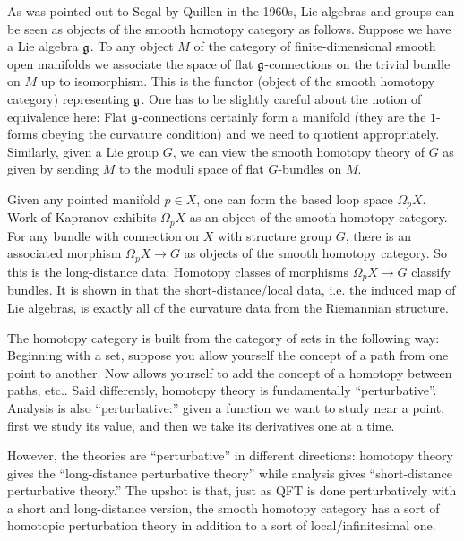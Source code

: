 As was pointed out to Segal by Quillen in the 1960s, 
Lie algebras and groups can be seen as objects of the smooth homotopy category as follows.
Suppose we have a Lie algebra $\mathfrak{g}$. To any object $M$ of the category of 
finite-dimensional smooth open manifolds 
we associate the space of flat $\mathfrak{g}$-connections on the trivial bundle on $M$ up to
isomorphism.
This is the functor (object of the smooth homotopy category) representing $\mathfrak{g}$. 
One has to be slightly careful about the notion of equivalence here:
Flat $\mathfrak{g}$-connections certainly form a manifold
(they are the $1$-forms obeying the curvature condition)
and we need to quotient appropriately. 
Similarly, given a Lie group $G$, we can view the smooth homotopy theory of $G$ as given
by sending $M$ to the moduli space of flat $G$-bundles on $M$.

Given any pointed manifold $p\in X$, one can form the based loop space 
$\Omega_p X$. Work of Kapranov \cite{Kap07} exhibits $\Omega_p X$ as an object of 
the smooth homotopy category. 
For any bundle with connection on $X$ with structure group $G$, 
there is an associated morphism $\Omega_p X \to G$ as objects of the smooth homotopy category.
So this is the long-distance data: 
Homotopy classes of morphisms $\Omega_p X \to G$ classify bundles.
It is shown in \cite{Kap07} that the short-distance/local data, i.e. the induced map of
Lie algebras, is exactly all of the curvature data from the Riemannian structure.

The homotopy category is built from the category of sets in the following way:
Beginning with a set, suppose you allow yourself the concept of a path from one point to
another. Now allows yourself to add the concept of a homotopy between paths, etc..
Said differently, homotopy theory is fundamentally ``perturbative''.
Analysis is also ``perturbative:'' given a function we want to study near a point, first
we study its value, and then we take its derivatives one at a time. 

However, the theories are ``perturbative'' in different directions: homotopy theory gives
the ``long-distance perturbative theory'' while analysis gives ``short-distance
perturbative theory.''
The upshot is that, just as QFT is done perturbatively with a short and long-distance
version, the smooth homotopy category has a sort of homotopic perturbation
theory in addition to a sort of local/infinitesimal one.
